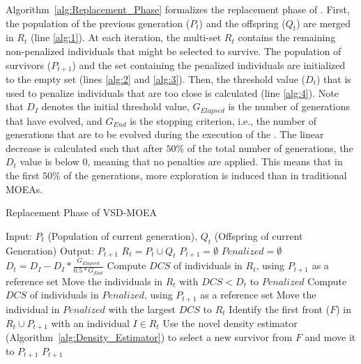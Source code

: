 Algorithm~\ref{alg:Replacement_Phase} formalizes the replacement phase of \VSDMOEA{}.
%
First, the population of the previous generation ($P_t$) and the offspring ($Q_t$) are merged
in $R_t$ (line \ref{alg:1}).
%
At each iteration, the multi-set $R_t$ contains the remaining non-penalized individuals that might be selected 
to survive.
%
The population of survivors ($P_{t+1}$) and the set containing the penalized individuals are initialized to
the empty set (lines \ref{alg:2} and \ref{alg:3}).
%
Then, the threshold value ($D_t$) that is used to penalize individuals that are too close is calculated (line \ref{alg:4}).
%
Note that $D_I$ denotes the initial threshold value, $G_{Elapsed}$ is the number of generations that have 
evolved, and $G_{End}$ is the stopping criterion, i.e., the number of generations that are to be evolved 
during the execution of the \VSDMOEA{}.
%
The linear decrease is calculated such that after $50\%$ of the total number of 
generations, the $D_t$ value is below 0, meaning that no penalties are applied.
%
This means that in the first $50\%$ of the generations, more exploration is induced than in traditional MOEAs.
%

\begin{algorithm}[t]
	\caption{Replacement Phase of VSD-MOEA} 
\begin{small}
\begin{algorithmic}[1]
\STATE Input: $P_t$ (Population of current generation), $Q_t$ (Offspring of current Generation)
    	\STATE Output: $P_{t+1}$ 
        \STATE $R_t = P_t \cup Q_t$ \label{alg:1}
        \STATE $P_{t+1} = \emptyset$ \label{alg:2}
        \STATE $Penalized = \emptyset$ \label{alg:3}
				\STATE $D_t = D_I - D_I * \frac{G_{Elapsed}}{0.5*G_{End}}$ \label{alg:4}
         \label{alg:6}
					\STATE Compute $DCS$ of individuals in $R_t$, using $P_{t+1}$ as a reference set \label{alg:7}
					\STATE Move the individuals in $R_t$ with $DCS < D_t$ to $Penalized$ \label{alg:8}
        	 \label{alg:9}
						\STATE Compute $DCS$ of individuals in $Penalized$, using $P_{t+1}$ as a reference set \label{alg:10}
						\STATE Move the individual in $Penalized$ with the largest $DCS$ to $R_t$ \label{alg:11}
        	\ENDIF
					\STATE Identify the first front ($F$) in $R_t \cup P_{t+1}$ with an individual $I \in R_t$ \label{alg:12}
					\STATE Use the novel density estimator (Algorithm~\ref{alg:Density_Estimator}) to select a new survivor 
					from $F$ and move it to $P_{t+1}$\label{alg:13}
        \ENDWHILE
    	\RETURN $P_{t+1}$ \label{alg:14}
	\end{algorithmic}
\end{small}
\label{alg:Replacement_Phase}
\end{algorithm}

